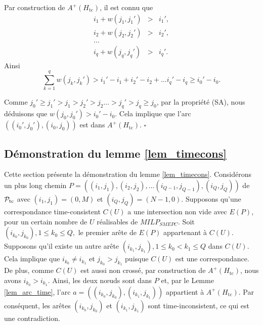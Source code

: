 {{Par construction de $A^+(H_\textrm{tc})$, il est connu que
\begin{displaymath}
\begin{array}{lcr}
i_1 + w(j_1, j_1') &> & i_1', \\
i_2 + w(j_2, j_2') & >& i_2', \\
\dots \\
i_q + w(j_q, j_q') & >& i_q'. 
\end{array}
\end{displaymath}
Ainsi 
$$ \sum_{k=1}^{q}{w(j_k, j_k') } > i_1' -  i_1 + i_2' - i_2 + \dots i_q' - i_q \geq i_0' - i_0.$$

Comme  $j_0' \geq j_1' > j_1 > j_2' >j_2 \dots > j_q' >j_q \geq j_0$,
par la propriété (SA), nous déduisons que $ w(j_0, j_0')  > i_0' - i_0$.
Cela implique que l'arc $((i_0', j_0') , (i_0, j_0)) $ est dans  $A^+(H_\textrm{tc})$. $\square$

\subsection{Démonstration du lemme \ref{lem_timecons}}
\label{lem_timecons_section}
Cette section présente la démonstration du lemme \ref{lem_timecons}.
Considérons un plus long chemin $P =( (i_1, j_1), (i_2, j_2), \dots (i_{Q-1}, j_{Q-1}), (i_{Q}, j_{Q}))$
de ${\cal P}_\textrm{tc}$
avec $(i_1, j_1)=(0,M)$ et $(i_{Q}, j_{Q})=(N-1, 0)$. 
Supposons qu'une correspondance time-consistent $C(U)$ a une intersection non vide avec $E(P)$, pour un certain nombre de $U$ réalisables de $MILP_{SMEPC}$. 
Soit $(i_{k_0},j_{k_0}), 1 \leq k_0 \leq Q,$ le premier arête de $E(P)$ appartenant à $C(U)$.
Supposons qu'il existe un autre arête $(i_{k_1},j_{k_1}), 1 \leq k_0 < k_1 \leq Q$ dans $C(U)$. Cela implique que $ i_{k_0} \neq i_{k_1}$ et $ j_{k_0} > j_{k_1}$ puisque $C(U)$ est une correspondance. De plus, comme $C(U)$ est aussi non crossé, par construction de $A^+(H_\textrm{tc})$, 
nous avons $ i_{k_0} > i_{k_1}$. 
Ainsi, les deux nœuds sont dans $P$ et, par le Lemme \ref{lem_arc_time}, l'arc $a=((i_{k_0},j_{k_0}), (i_{k_1},j_{k_1})) $ appartient à  $A^+(H_\textrm{tc})$. 
Par conséquent, les arêtes $(i_{k_0},j_{k_0})$ et $(i_{k_1},j_{k_1})$
sont time-inconsistent, ce qui est une contradiction.
}
}
